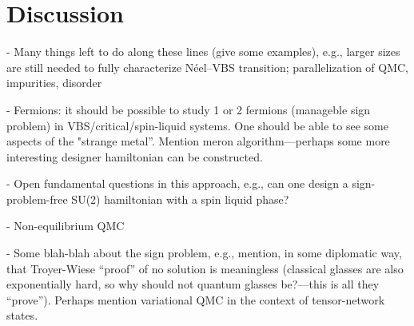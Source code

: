 \documentclass[aps,prb,groupedaddress, twocolumn]{revtex4}
\begin{document}
\section{Discussion}
- Many things left to do along these lines (give some examples), e.g., larger sizes are still needed
to fully characterize N\'eel--VBS transition; parallelization of QMC, impurities, disorder

- Fermions: it should be possible to study 1 or 2 fermions (manageble sign problem) in 
VBS/critical/spin-liquid systems. One should be able to see some aspects of the "strange metal''.
Mention meron algorithm---perhaps some more interesting designer hamiltonian can be constructed.

- Open fundamental questions in this approach, e.g., can one design a sign-problem-free
  SU(2) hamiltonian with a spin liquid phase?

- Non-equilibrium QMC

- Some blah-blah about the sign problem, e.g., mention, in some diplomatic way, that Troyer-Wiese ``proof'' of no 
solution is meaningless (classical glasses are also exponentially hard, so why should not quantum glasses be?---this
is all they ``prove''). Perhaps mention variational QMC in the context of tensor-network states.

\end{document}
